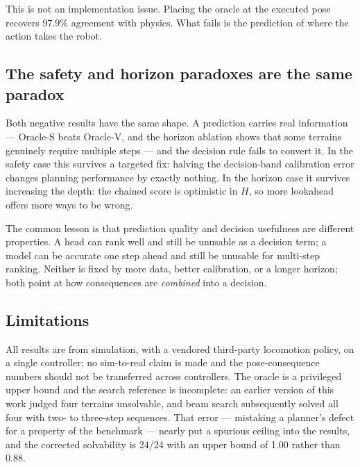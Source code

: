 \documentclass[utf8]{FrontiersinHarvard}
\begin{document}
This is not an implementation issue. Placing the oracle at the executed pose recovers
97.9\% agreement with physics. What fails is the prediction of where the action takes
the robot.

\subsection{The safety and horizon paradoxes are the same paradox}

Both negative results have the same shape. A prediction carries real information ---
Oracle-S beats Oracle-V, and the horizon ablation shows that some terrains genuinely
require multiple steps --- and the decision rule fails to convert it. In the safety case
this survives a targeted fix: halving the decision-band calibration error changes
planning performance by exactly nothing. In the horizon case it survives increasing the
depth: the chained score is optimistic in $H$, so more lookahead offers more ways to be
wrong.

The common lesson is that prediction quality and decision usefulness are different
properties. A head can rank well and still be unusable as a decision term; a model can
be accurate one step ahead and still be unusable for multi-step ranking. Neither is
fixed by more data, better calibration, or a longer horizon; both point at how
consequences are \emph{combined} into a decision.

\subsection{Limitations}

All results are from simulation, with a vendored third-party locomotion policy, on a
single controller; no sim-to-real claim is made and the pose-consequence numbers should
not be transferred across controllers. The oracle is a privileged upper bound and the
search reference is incomplete: an earlier version of this work judged four terrains
unsolvable, and beam search subsequently solved all four with two- to three-step
sequences. That error --- mistaking a planner's defect for a property of the benchmark
--- nearly put a spurious ceiling into the results, and the corrected solvability is
24/24 with an upper bound of 1.00 rather than 0.88.
\end{document}
